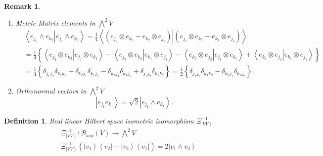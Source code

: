 \documentclass[aps,preprint]{revtex4}%
\newtheorem{definition}[theorem]{Definition}
\newtheorem{remark}[theorem]{Remark}
\begin{document}
\begin{remark}
\begin{enumerate}
\item Metric Matrix elements in $%
{\textstyle\bigwedge\nolimits^{2}}
V$%
\begin{align}
&  \left\langle \left.  e_{j_{2}}\wedge e_{k_{2}}\right\vert e_{j_{1}}\wedge
e_{k_{1}}\right\rangle =\frac{1}{4}\left\langle \left.  \left(  e_{j_{2}%
}\otimes e_{k_{2}}-e_{k_{2}}\otimes e_{j_{2}}\right)  \right\vert \left(
e_{j_{1}}\otimes e_{k_{1}}-e_{k_{1}}\otimes e_{j_{1}}\right)  \right\rangle \\
&  =\frac{1}{4}\left\{  \left\langle \left.  e_{j_{2}}\otimes e_{k_{2}%
}\right\vert e_{j_{1}}\otimes e_{k_{1}}\right\rangle -\left\langle \left.
e_{j_{2}}\otimes e_{k_{2}}\right\vert e_{k_{1}}\otimes e_{j_{1}}\right\rangle
-\left\langle \left.  e_{k_{2}}\otimes e_{j_{2}}\right\vert e_{j_{1}}\otimes
e_{k_{1}}\right\rangle +\left\langle \left.  e_{k_{2}}\otimes e_{j_{2}%
}\right\vert e_{k_{1}}\otimes e_{j_{1}}\right\rangle \right\} \\
&  =\frac{1}{4}\left\{  \delta_{j_{1}j_{2}}\delta_{k_{1}k_{2}}-\delta
_{k_{2}j_{1}}\delta_{k_{1}j_{2}}-\delta_{k_{2}j_{1}}\delta_{k_{1}j_{2}}%
+\delta_{j_{1}j_{2}}\delta_{k_{1}k_{2}}\right\}  =\frac{1}{2}\left\{
\delta_{j_{1}j_{2}}\delta_{k_{1}k_{2}}-\delta_{k_{2}j_{1}}\delta_{k_{1}j_{2}%
}\right\}  .
\end{align}


\item Orthonormal vectors in $%
{\textstyle\bigwedge\nolimits^{2}}
V$
\begin{equation}
\left\vert e_{j_{1}}e_{k_{1}}\right\rangle =\sqrt{2}\left\vert e_{j_{1}}\wedge
e_{k_{1}}\right\rangle .
\end{equation}
\label{Correspondence between Operatotrs and Geminals}
\end{enumerate}
\end{remark}

\begin{definition}
\emph{Real} linear Hilbert space isometric isomorphism $\mathcal{\Xi
}_{\left\vert VV\right\rangle }^{-1}$
\begin{gather}
\mathcal{\Xi}_{\left\vert VV\right\rangle }^{-1}:\mathcal{B}_{asa}\left(
V\right)  \rightarrow%
{\textstyle\bigwedge\nolimits^{2}}
V\\
\mathcal{\Xi}_{\left\vert VV\right\rangle }^{-1}\left(  \overset{}{\left\vert
v_{1}\right\rangle \left\langle v_{2}\right\vert -\left\vert v_{2}%
\right\rangle \left\langle v_{1}\right\vert }\right)  =2\left\vert v_{1}\wedge
v_{2}\right\rangle
\end{gather}

\end{definition}
\end{document}
